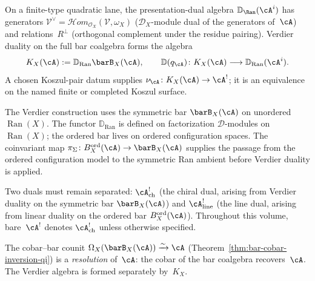 \begin{convention}
On a finite-type quadratic lane, the presentation-dual algebra
$\mathbb D_{\Ran}(\cA^i)$ has generators $\mathcal{V}^\vee =
\mathcal{H}om_{\mathcal{O}_X}(\mathcal{V}, \omega_X)$
($\mathcal{D}_X$-module dual of the generators of~$\cA$) and
relations~$R^\perp$ (orthogonal complement under the residue
pairing).  Verdier duality on the full bar coalgebra forms the algebra
\[
K_X(\cA):=\mathbb{D}_{\operatorname{Ran}}\barB_X(\cA),
\qquad
\mathbb D(q_\cA)\colon
K_X(\cA)\longrightarrow\mathbb D_{\operatorname{Ran}}(\cA^i).
\]
A chosen Koszul-pair datum supplies
$\nu_\cA\colon K_X(\cA)\to\cA^!$; it is an equivalence on the named
finite or completed Koszul surface.
\begin{remark}
The Verdier construction uses the symmetric bar
$\barB_X(\cA)$ on unordered $\operatorname{Ran}(X)$.
The functor $\mathbb{D}_{\operatorname{Ran}}$ is defined on
factorization $\mathcal{D}$-modules on $\operatorname{Ran}(X)$;
the ordered bar lives on ordered configuration spaces.
The coinvariant map
$\pi_\Sigma\colon B_X^{\mathrm{ord}}(\cA)\to\barB_X(\cA)$
supplies the passage from the ordered configuration model to the
symmetric Ran ambient before Verdier duality is applied.
\end{remark}
\begin{remark}
Two duals must remain separated:
$\cA^!_{\mathrm{ch}}$ (the chiral dual, arising from Verdier duality on
the symmetric bar $\barB_X(\cA)$) and $\cA^!_{\mathrm{line}}$ (the line
dual, arising from linear duality on the ordered
bar $B^{\mathrm{ord}}_X(\cA)$). Throughout this volume, bare~$\cA^!$
denotes $\cA^!_{\mathrm{ch}}$ unless otherwise specified.
\end{remark}
The cobar--bar counit
$\Omega_X(\barB_X(\cA)) \xrightarrow{\sim} \cA$
(Theorem~\ref{thm:bar-cobar-inversion-qi})
is a \emph{resolution} of~$\cA$: the cobar of the bar coalgebra
recovers~$\cA$.  The Verdier algebra is formed separately by~$K_X$.


\end{convention}
